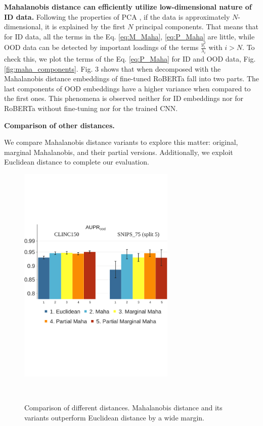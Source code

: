 \documentclass[letterpaper, final]{article} %
\begin{document}
{\bf Mahalanobis distance can efficiently utilize low-dimensional nature of ID data.} 
 Following the properties of PCA \cite{murphy2012machine}, if the data is approximately $N$-dimensional, it is explained by the first $N$ principal components. That means that for ID data, all the terms in the Eq. \ref{eq:M_Maha}, \ref{eq:P_Maha} are little, while OOD data can be detected by important loadings of the terms $\frac{y_i^2}{\lambda_i}$ with $i>N$.
 To check this, we plot the terms of the Eq. \ref{eq:P_Maha} for ID and OOD data, Fig. \ref{fig:maha_components}. Fig. 3 shows that when decomposed with the Mahalanobis distance embeddings of fine-tuned RoBERTa fall into two parts. The last components of OOD embeddings have a higher variance when compared to the first ones. This phenomena is observed neither for ID embeddings nor for RoBERTa without fine-tuning nor for the trained CNN. 


{\bf Comparison of other distances.}

 We compare Mahalanobis distance variants to explore this matter: original, marginal Mahalanobis, and their partial versions. Additionally, we exploit Euclidean distance to complete our evaluation.  


\begin{figure}[ht]
\centering

  \begin{subfloat}
    \centering\includegraphics[width=7.5cm]{images/roberta_aupr_clinc_snips}
    \caption*{}
  \end{subfloat}
  \leavevmode\\[-8ex]

  \caption{Comparison of different distances. Mahalanobis distance and its variants outperform Euclidean distance by a wide margin.}
  \label{fig:maha_var_comp}
\end{figure}
\end{document}
